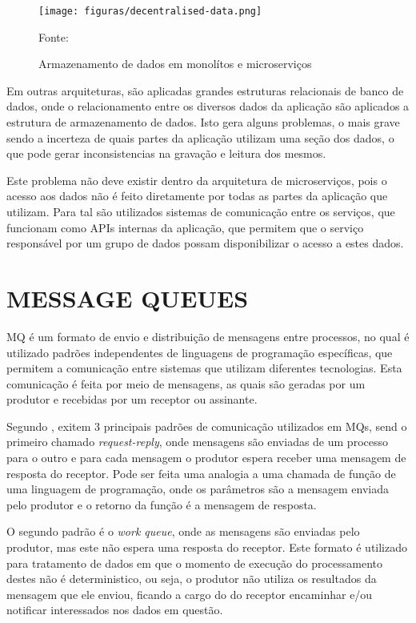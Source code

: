 \begin{figure}[H]
	\centering
	\caption{Armazenamento de dados em monolítos e microserviços}
	\texttt{[image: figuras/decentralised-data.png]}

	\label{fig:db-monolith-microservices}
	\footnotesize Fonte: 
\end{figure}

Em outras arquiteturas, são aplicadas grandes estruturas relacionais de banco
de dados, onde o relacionamento entre os diversos dados da aplicação são
aplicados a estrutura de armazenamento de dados. Isto gera alguns problemas,
o mais grave sendo a incerteza de quais partes da aplicação utilizam uma
seção dos dados, o que pode gerar inconsistencias na gravação e leitura dos
mesmos.

Este problema não deve existir dentro da arquitetura de microserviços, pois o
acesso aos dados não é feito diretamente por todas as partes da aplicação que
utilizam. Para tal são utilizados sistemas de comunicação entre os serviços,
que funcionam como \acp{API} internas da aplicação, que permitem que o serviço
responsável por um grupo de dados possam disponibilizar o acesso a estes dados.

\section{MESSAGE QUEUES}

\ac{MQ} é um formato de envio e distribuição de mensagens entre processos,
no qual é utilizado padrões independentes de linguagens de programação
específicas, que permitem a comunicação entre sistemas que utilizam diferentes
tecnologias. Esta comunicação é feita por meio de mensagens, as quais são
geradas por um produtor e recebidas por um receptor ou assinante.

Segundo , exitem 3 principais padrões de comunicação
utilizados em \acp{MQ}, send o primeiro chamado \emph{request-reply}, onde
mensagens são enviadas de um processo para o outro e para cada mensagem o
produtor espera receber uma mensagem de resposta do receptor. Pode ser feita
uma analogia a uma chamada de função de uma linguagem de programação, onde os
parâmetros são a mensagem enviada pelo produtor e o retorno da função é a
mensagem de resposta.

O segundo padrão é o \emph{work queue}, onde as mensagens são enviadas pelo
produtor, mas este não espera uma resposta do receptor. Este formato é
utilizado para tratamento de dados em que o momento de execução do
processamento destes não é deterministico, ou seja, o produtor não utiliza
os resultados da mensagem que ele enviou, ficando a cargo do do receptor
encaminhar e/ou notificar interessados nos dados em questão.

